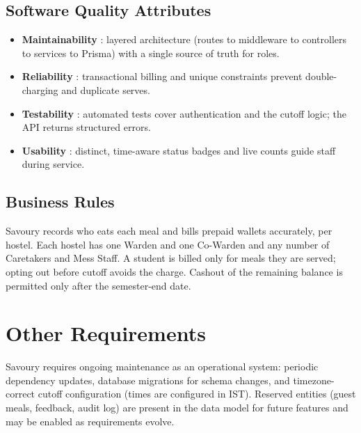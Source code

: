 \documentclass{scrreprt}
\begin{document}
\section{Software Quality Attributes}
\begin{itemize}
  \item \textbf{Maintainability} : layered architecture
  (routes to middleware to controllers to services to Prisma) with a
  single source of truth for roles.
  \item \textbf{Reliability} : transactional billing and unique constraints
  prevent double-charging and duplicate serves.
  \item \textbf{Testability} : automated tests cover authentication and the
  cutoff logic; the API returns structured errors.
  \item \textbf{Usability} : distinct, time-aware status badges and live
  counts guide staff during service.
\end{itemize}

\section{Business Rules}
Savoury records who eats each meal and bills prepaid wallets accurately,
per hostel. Each hostel has one Warden and one Co-Warden and any number
of Caretakers and Mess Staff. A student is billed only for meals they are
served; opting out before cutoff avoids the charge. Cashout of the
remaining balance is permitted only after the semester-end date.

\chapter{Other Requirements}
Savoury requires ongoing maintenance as an operational system: periodic
dependency updates, database migrations for schema changes, and
timezone-correct cutoff configuration (times are configured in IST).
Reserved entities (guest meals, feedback, audit log) are present in the
data model for future features and may be enabled as requirements evolve.
\end{document}
